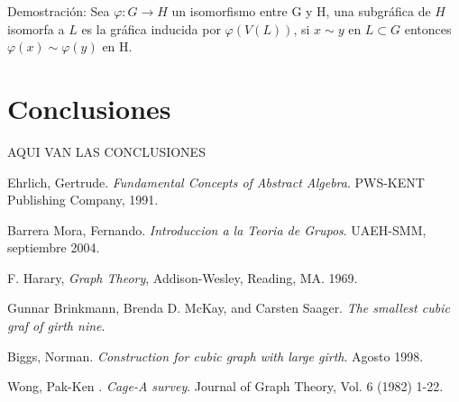 \documentclass[11pt]{book}
\theoremstyle{definition}
\newcounter{in}
\begin{document}
Demostración: Sea $\varphi : G \rightarrow H$ un isomorfismo entre G
y H, una subgráfica de $H$ isomorfa a $L$ es la gráfica inducida por
$\varphi (V(L))$, si $x\sim y$ en $L\subset G$ entonces $\varphi
(x)\sim \varphi (y)$ en H.





\chapter{Conclusiones}

AQUI VAN LAS CONCLUSIONES

\begin{thebibliography}{0}


Ehrlich, Gertrude. \emph{ Fundamental Concepts of Abstract Algebra}. PWS-KENT Publishing Company, 1991.

Barrera Mora, Fernando. \emph{ Introduccion a la Teoria de Grupos}. UAEH-SMM, septiembre 2004.

F. Harary, \emph{ Graph Theory}, Addison-Wesley, Reading, MA. 1969.

Gunnar Brinkmann, Brenda D. McKay, and Carsten Saager. \emph{ The smallest cubic graf of girth nine}. 

Biggs, Norman. \emph{Construction for cubic graph with large girth}. Agosto 1998. 

Wong, Pak-Ken . \emph{Cage-A survey}. Journal of Graph Theory, Vol. 6 (1982) 1-22.

\end{thebibliography}



\printindex
\end{document}
